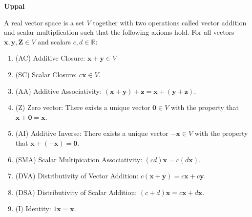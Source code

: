 \documentclass{article}
\newcommand{\bff}[1]{\mathbf{#1}}
\begin{document}
    \hfill
    \begin{minipage}[t]{.45\textwidth} %
        \begin{center}
            \textbf{Uppal}
        \end{center}
        A real vector space is a set $V$ together with two operations called vector addition and scalar multiplication such that the following axioms hold. For all vectors $\bff{x}, \bff{y}, \bff{Z} \in V$ and scalars $c,d \in \mathbb{R}$:
        \vspace{2mm}

        \begin{enumerate}
            \setlength\itemsep{1.5mm}
            \item (AC) Additive Closure: $\bff{x}+\bff{y} \in V$
            \item (SC) Scalar Closure: $c\bff{x} \in V$.
            \item (AA) Additive Associativity: $(\bff{x}+\bff{y})+\bff{z}=\bff{x}+(\bff{y}+\bff{z})$.
            \item (Z) Zero vector: There exists a unique vector $\bff{0} \in V$ with the property that $\bff{x}+\bff{0} = \bff{x}$.
            \item (AI) Additive Inverse: There exists a unique vector $\bff{-x} \in V$ with the property that $\bff{x} + (\bff{-x})=\bff{0}$.
            \item (SMA) Scalar Multipication Associativity: $(cd)\bff{x} = c(d\bff{x})$.
            \item (DVA) Distributivity of Vector Addition: $c(\bff{x}+\bff{y})=c\bff{x}+c\bff{y}$.
            \item (DSA) Distributivity of Scalar Addition: $(c+d)\bff{x}=c\bff{x}+d\bff{x}$.
            \item (I) Identity: $1\bff{x} = \bff{x}$.
        \end{enumerate}
    \end{minipage}
\end{document}
